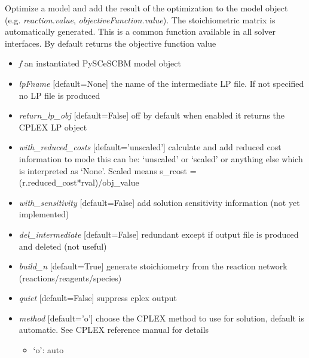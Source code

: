 \documentclass[a4paper,11pt,english]{sphinxmanual}
\begin{document}
\begin{fulllineitems}
\label{modules_doc:cbmpy.CBCPLEX.cplx_analyzeModel}
Optimize a model and add the result of the optimization to the model object
(e.g. \emph{reaction.value}, \emph{objectiveFunction.value}). The stoichiometric
matrix is automatically generated. This is a common function available
in all solver interfaces. By default returns the objective function value
\begin{itemize}
\item {} 
\emph{f} an instantiated PySCeSCBM model object

\item {} 
\emph{lpFname} {[}default=None{]} the name of the intermediate LP file. If not specified no LP file is produced

\item {} 
\emph{return\_lp\_obj} {[}default=False{]} off by default when enabled it returns the CPLEX LP object

\item {} 
\emph{with\_reduced\_costs} {[}default='unscaled'{]} calculate and add reduced cost information to mode this can be: `unscaled' or `scaled'
or anything else which is interpreted as `None'. Scaled means s\_rcost = (r.reduced\_cost*rval)/obj\_value

\item {} 
\emph{with\_sensitivity} {[}default=False{]} add solution sensitivity information (not yet implemented)

\item {} 
\emph{del\_intermediate} {[}default=False{]} redundant except if output file is produced and deleted (not useful)

\item {} 
\emph{build\_n} {[}default=True{]} generate stoichiometry from the reaction network (reactions/reagents/species)

\item {} 
\emph{quiet} {[}default=False{]} suppress cplex output

\item {} 
\emph{method} {[}default='o'{]} choose the CPLEX method to use for solution, default is automatic. See CPLEX reference manual for details
\begin{itemize}
\item {} 
`o': auto


\end{itemize}
\end{itemize}
\end{fulllineitems}
\end{document}
